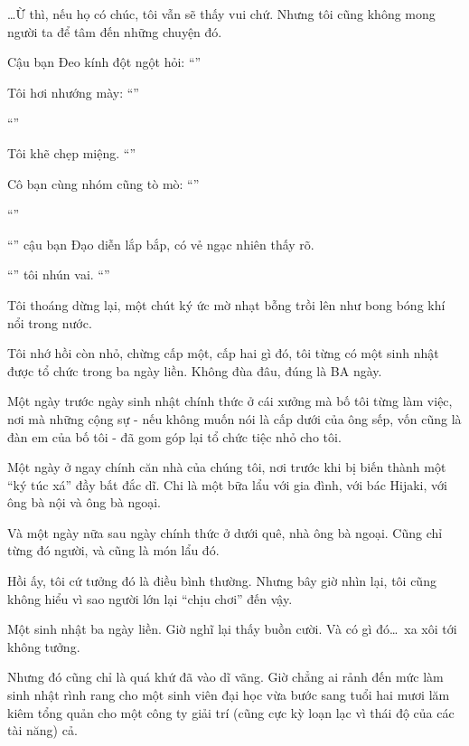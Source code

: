 \documentclass[../main.tex]{subfiles}
\begin{document}
\dots Ừ thì, nếu họ có chúc, tôi vẫn sẽ thấy vui chứ. Nhưng tôi cũng không mong người ta để tâm đến những chuyện đó.

Cậu bạn Đeo kính đột ngột hỏi: ``''

Tôi hơi nhướng mày: ``''

``''

Tôi khẽ chẹp miệng. ``''

Cô bạn cùng nhóm cũng tò mò: ``''

``''

``'' cậu bạn Đạo diễn lắp bắp, có vẻ ngạc nhiên thấy rõ.

``'' tôi nhún vai. ``''

Tôi thoáng dừng lại, một chút ký ức mờ nhạt bỗng trồi lên như bong bóng khí nổi trong nước.

Tôi nhớ hồi còn nhỏ, chừng cấp một, cấp hai gì đó, tôi từng có một sinh nhật được tổ chức trong ba ngày liền. Không đùa đâu, đúng là BA ngày.

Một ngày trước ngày sinh nhật chính thức ở cái xưởng mà bố tôi từng làm việc, nơi mà những cộng sự - nếu không muốn nói là cấp dưới của ông sếp, vốn cũng là đàn em của bố tôi - đã gom góp lại tổ chức tiệc nhỏ cho tôi.

Một ngày ở ngay chính căn nhà của chúng tôi, nơi trước khi bị biến thành một ``ký túc xá'' đầy bất đắc dĩ. Chi là một bữa lẩu với gia đình, với bác Hijaki, với ông bà nội và ông bà ngoại.

Và một ngày nữa sau ngày chính thức ở dưới quê, nhà ông bà ngoại. Cũng chỉ từng đó người, và cũng là món lẩu đó.

Hồi ấy, tôi cứ tưởng đó là điều bình thường. Nhưng bây giờ nhìn lại, tôi cũng không hiểu vì sao người lớn lại ``chịu chơi'' đến vậy.

Một sinh nhật ba ngày liền. Giờ nghĩ lại thấy buồn cười. Và có gì đó\dots\ xa xôi tới không tưởng.

Nhưng đó cũng chỉ là quá khứ đã vào dĩ vãng. Giờ chẳng ai rảnh đến mức làm sinh nhật rình rang cho một sinh viên đại học vừa bước sang tuổi hai mươi lăm kiêm tổng quản cho một công ty giải trí (cũng cực kỳ loạn lạc vì thái độ của các tài năng) cả.
\end{document}

